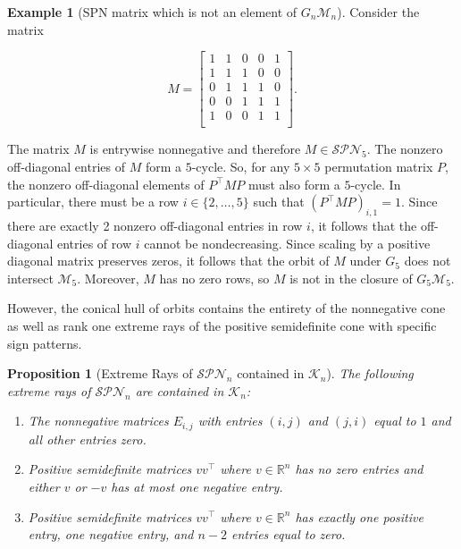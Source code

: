 \documentclass{amsart}
\newcommand{\bbR}{\mathbb{R}}
\newcommand{\cM}{\mathcal{M}}
\newcommand{\cK}{\mathcal{K}}
\newcommand{\SPN}{\mathcal{SPN}}
\newtheorem{proposition}[theorem]{Proposition}
\theoremstyle{definition}
\newtheorem{example}[theorem]{Example}
\begin{document}
\begin{example}[SPN matrix which is not an element of $G_n\cM_n$] 
Consider the matrix 

\[M = \begin{bmatrix} 1 & 1 & 0 & 0 & 1\\ 1 & 1 & 1 & 0 & 0\\ 0 & 1 & 1 & 1 & 0\\ 0 & 0 & 1 & 1 & 1\\ 1 & 0 & 0 & 1 & 1\\\end{bmatrix}.\]

The matrix $M$ is entrywise nonnegative and therefore $M \in \SPN_5$. The nonzero off-diagonal entries of $M$ form a $5$-cycle. So, for any $5\times 5$ permutation matrix $P$, the nonzero off-diagonal elements of $P^{\top}MP$ must also form a $5$-cycle. In particular, there must be a row $i \in \{2,\ldots, 5\}$  such that $(P^{\top}MP)_{i,1} = 1$. Since there are exactly 2 nonzero off-diagonal entries in row $i$, it follows that the off-diagonal entries of row $i$ cannot be nondecreasing. Since scaling by a positive diagonal matrix preserves zeros, it follows that the orbit of $M$ under $G_5$ does not intersect $\cM_5$. Moreover, $M$ has no zero rows, so $M$ is not in the closure of $G_5\cM_5$.
\end{example}

However, the conical hull of orbits contains the entirety of the nonnegative cone as well as rank one extreme rays of the positive semidefinite cone with specific sign patterns.

\begin{proposition}[Extreme Rays of $\SPN_n$ contained in $\cK_n$]\label{prop:ExtremeRaysKn}
The following extreme rays of $\SPN_n$ are contained in $\cK_n$:
\begin{enumerate}
    \item The nonnegative matrices $E_{i,j}$ with entries $(i,j)$ and $(j,i)$ equal to $1$ and all other entries zero.
    \item Positive semidefinite matrices $vv^\top$ where $v\in \bbR^n$ has no zero entries and either $v$ or $-v$ has at most one negative entry. 
    \item Positive semidefinite matrices $vv^\top$ where $v \in \bbR^n$ has exactly one positive entry, one negative entry, and $n - 2$ entries equal to zero. 
\end{enumerate}
\end{proposition}
\end{document}
